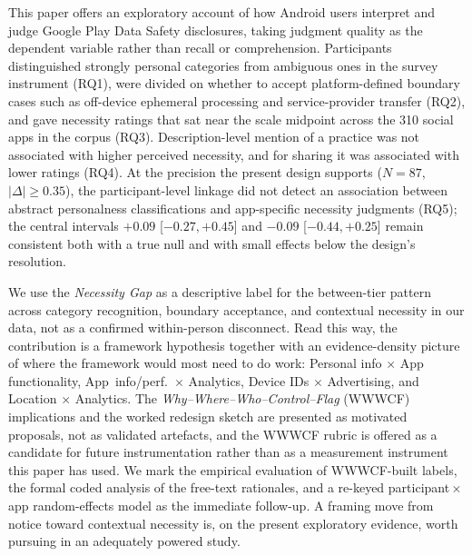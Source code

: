 \documentclass[11pt,a4paper]{article}
\begin{document}
This paper offers an exploratory account of how Android users interpret
and judge Google Play Data Safety disclosures, taking judgment quality
as the dependent variable rather than recall or comprehension.
Participants distinguished strongly personal categories from ambiguous
ones in the survey instrument (RQ1), were divided on whether to accept
platform-defined boundary cases such as off-device ephemeral processing
and service-provider transfer (RQ2), and gave necessity ratings that
sat near the scale midpoint across the 310 social apps in the corpus
(RQ3). Description-level mention of a practice was not associated with
higher perceived necessity, and for sharing it was associated with
lower ratings (RQ4). At the precision the present design supports
($N=87$, $|\Delta|\geq 0.35$), the participant-level linkage did not
detect an association between abstract personalness classifications
and app-specific necessity judgments (RQ5); the central intervals
$+0.09$ {[$-0.27, +0.45$]} and $-0.09$ {[$-0.44, +0.25$]} remain
consistent both with a true null and with small effects below the
design's resolution.

We use the \emph{Necessity Gap} as a descriptive label for the
between-tier pattern across category recognition, boundary acceptance,
and contextual necessity in our data, not as a confirmed within-person
disconnect. Read this way, the contribution is a framework hypothesis
together with an evidence-density picture of where the framework would
most need to do work: Personal info $\times$ App functionality,
App~info/perf.\ $\times$ Analytics, Device IDs $\times$ Advertising,
and Location $\times$ Analytics. The
\emph{Why--Where--Who--Control--Flag} (WWWCF) implications and the
worked redesign sketch are presented as motivated proposals, not as
validated artefacts, and the WWWCF rubric is offered as a candidate
for future instrumentation rather than as a measurement instrument
this paper has used. We mark the empirical evaluation of WWWCF-built
labels, the formal coded analysis of the free-text rationales, and a
re-keyed participant\,$\times$\,app random-effects model as the
immediate follow-up. A framing move from notice
toward contextual necessity is, on the present exploratory evidence,
worth pursuing in an adequately powered study.



\end{document}
